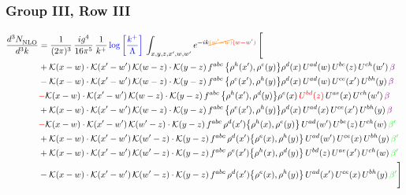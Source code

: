 \documentclass[9pt]{article}
\numberwithin{equation}{section}
\begin{document}
\subsubsection{Group III, Row III} 
\begin{align}
     \frac{d^{3}N_{\rm NLO}^{\rm}}{d^{3}k}  & = \frac{1}{(2\pi)^{3}}\, \frac{ig^{4}}{16\pi^{5}}\, \frac{1}{k^{+}}\, {\color{blue}\log{\left[\frac{k^{+}}{\Lambda}\right]}}\, \int_{x,y,z,x^{\prime},w,w^{\prime}}e^{-ik{\color{orange}\cancel{(w^{\prime}-w)}}{\color{red}(w-w^{\prime})}}\, \Bigg[\notag \\ & +\mathcal{K}(x-w)\cdot\mathcal{K}(x'-w')\,\mathcal{K}(w-z)\cdot\mathcal{K}(y-z)\, f^{abc}\,\big\{\rho^{h}(x'),\rho^{e}(y)\big\}\rho^{d}(x)\,U^{ad}(w)\,U^{be}(z)\,U^{ch}(w')\,{\color{violet}\beta}\notag\\
&-\mathcal{K}(x-w)\cdot\mathcal{K}(x'-w')\,\mathcal{K}(w-z)\cdot\mathcal{K}(y-z)\, f^{abc}\,\big\{\rho^{e}(x'),\rho^{h}(y)\big\}\rho^{d}(x)\,U^{ad}(w)\,U^{ce}(x')\,U^{bh}(y)\,{\color{violet}\beta}\notag\\ &{\color{red}-}\mathcal{K}(x-w)\cdot\mathcal{K}(x'-w')\,\mathcal{K}(w-z)\cdot\mathcal{K}(y-z)\, f^{abc}\,\big\{\rho^{h}(x'),\rho^{d}(y)\big\}\rho^{e}(x)\,{\color{red}U^{bd}(z)}\,U^{ae}(x)\,U^{ch}(w')\,{\color{violet}\beta}\notag\\ & +\mathcal{K}(x-w)\cdot\mathcal{K}(x'-w')\,\mathcal{K}(w-z)\cdot\mathcal{K}(y-z)\, f^{abc}\,\big\{\rho^{e}(x'),\rho^{h}(y)\big\}\rho^{d}(x)\,U^{ad}(x)\,U^{ce}(x')\,U^{bh}(y)\,{\color{violet}\beta}\notag\\ &{\color{red}-}\mathcal{K}(x-w)\cdot\mathcal{K}(x'-w')\,\mathcal{K}(w'-z)\cdot\mathcal{K}(y-z)\, f^{abc}\,\rho^{d}(x')\big\{\rho^{h}(x),\rho^{e}(y)\big\}\,U^{ad}(w')\,U^{be}(z)\,U^{ch}(w)\,{\color{green}\beta'}\notag\\ &+\mathcal{K}(x-w)\cdot\mathcal{K}(x'-w')\,\mathcal{K}(w'-z)\cdot\mathcal{K}(y-z)\, f^{abc}\,\rho^{d}(x')\big\{\rho^{e}(x),\rho^{h}(y)\big\}\,U^{ad}(w')\,U^{ce}(x)\,U^{bh}(y)\,{\color{green}\beta'} \notag\\ & +\mathcal{K}(x-w)\cdot\mathcal{K}(x'-w')\,\mathcal{K}(w'-z)\cdot\mathcal{K}(y-z)\, f^{abc}\,\rho^{e}(x')\big\{\rho^{h}(x),\rho^{d}(y)\big\}\,U^{bd}(z)\,U^{ae}(x')\,U^{ch}(w)\,{\color{green}\beta'} \notag\\ & -\mathcal{K}(x-w)\cdot\mathcal{K}(x'-w')\,\mathcal{K}(w'-z)\cdot\mathcal{K}(y-z)\, f^{abc}\,\rho^{d}(x')\big\{\rho^{e}(x),\rho^{h}(y)\big\}\,U^{ad}(x')\,U^{ce}(x)\,U^{bh}(y)\,{\color{green}\beta'}\Bigg]\end{align}     
\end{document}
